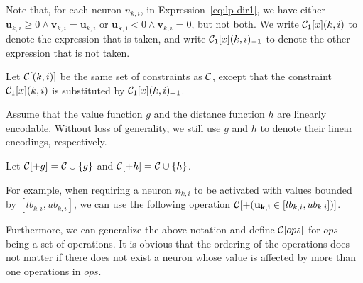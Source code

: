 \documentclass[runningheads,a4paper]{llncs}
\newcommand{\valuefunction}{g}
\newcommand{\distancefunction}{h}
\begin{document}
Note that, for each neuron $n_{k,i}$, in Expression~\ref{eq:lp-dir1}, we
have either $\mathbf{u}_{k,i}\geq 0 \wedge
\mathbf{v}_{k,i}=\mathbf{u}_{k,i}$ or $\mathbf{u_{k,i}}< 0 \wedge
\mathbf{v}_{k,i}=0$, but not both.  We write $\mathcal{C}_1[x](k,i)$ to
denote the expression that is taken, and write $\mathcal{C}_1[x](k,i)_{-1}$
to denote the other expression that is not taken.

\begin{definition}\label{def:ap-except}
%
Let $\mathcal{C}[(k,i)]$ be the same set of constraints as $\mathcal{C}$,
except that the constraint  $\mathcal{C}_1[x](k,i)$ is substituted by
$\mathcal{C}_1[x](k,i)_{-1}$.
%
\end{definition}

Assume that the value function $\valuefunction$ and the distance function
$\distancefunction$ are linearly encodable.  Without loss of generality, we
still use $\valuefunction$ and $\distancefunction$ to denote their linear
encodings, respectively.

\begin{definition}
Let $\constraints[+\valuefunction]= \constraints\cup \{\valuefunction\}$ and $\constraints[+\distancefunction]=\constraints\cup \{\distancefunction \}$.  
\end{definition}%
For example, when requiring a neuron $n_{k,i}$ to be activated with values
bounded by $[lb_{k,i}, ub_{k,i}]$, we can use the following operation
$\mathcal{C}[+ (\mathbf{u_{k,i}} \in [lb_{k,i}, ub_{k,i}])]$.

Furthermore, we can generalize the above notation and define
$\mathcal{C}[ops]$ for $ops$ being a set of operations.  It is obvious that
the ordering of the operations does not matter if there does not exist a
neuron whose value is affected by more than one operations in $ops$.
\end{document}
